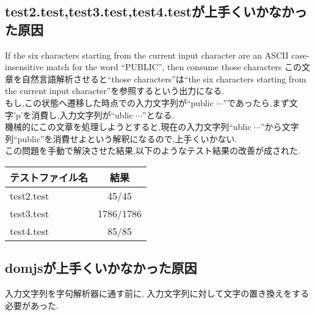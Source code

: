 \documentclass[uplatex,a4j]{jsreport}
\begin{document}
\subsection*{test2.test,test3.test,test4.testが上手くいかなかった原因}%
If the six characters starting from the current input character are an ASCII case-insensitive match for the word ``PUBLIC'', then consume those characters
この文章を自然言語解析させると``those characters''は``the six characters starting from the current input character''を参照するという出力になる.\\
もし,この状態へ遷移した時点での入力文字列が``public $\cdots$''であったら,まず文字'p'を消費し,入力文字列が``ublic $\cdots$''となる.\\
機械的にこの文章を処理しようとすると,現在の入力文字列``ublic $\cdots$''から文字列``public''を消費せよという解釈になるので,上手くいかない.\\
この問題を手動で解決させた結果,以下のようなテスト結果の改善が成された.\\
\begin{table}[htb]
    \begin{tabular}{|l|c|} \hline
      テストファイル名 & 結果 \\ \hline 
      test2.test & 45/45 \\
      test3.test & 1786/1786 \\
      test4.test & 85/85 \\ \hline 
    \end{tabular}
\end{table}

\subsection*{domjsが上手くいかなかった原因}
入力文字列を字句解析器に通す前に, 入力文字列に対して文字の置き換えをする必要があった.
\end{document}
